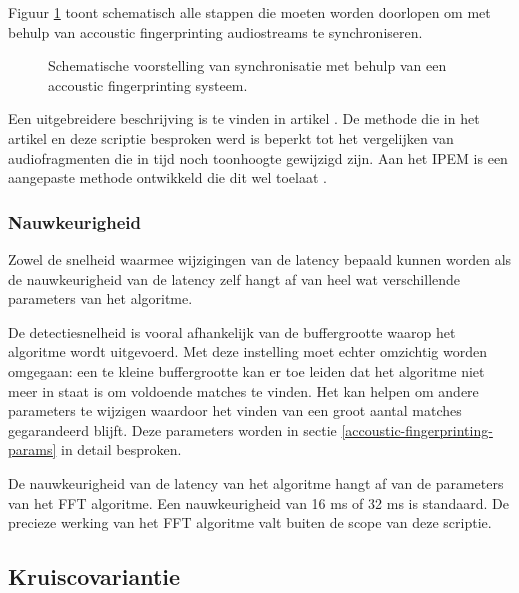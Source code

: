 Figuur \ref{schematische-synchronisatie} toont schematisch alle stappen die moeten worden doorlopen om met behulp van accoustic fingerprinting audiostreams te synchroniseren.

\vspace{0.3cm}
\begin{figure}[h]
	\captionsetup{width=0.7\textwidth}
	\caption[Schema synchronisatie met fingerprinting]{Schematische voorstelling van synchronisatie met behulp van een accoustic fingerprinting systeem.}
	\advance\parskip0.5cm
	
	\advance\parskip1cm
	\label{schematische-synchronisatie}
\end{figure}
\vspace{2.5cm}

Een uitgebreidere beschrijving is te vinden in artikel \cite{Wang2003a}. De methode die in het artikel en deze scriptie besproken werd is beperkt tot het vergelijken van audiofragmenten die in tijd noch toonhoogte gewijzigd zijn. Aan het IPEM is een aangepaste methode ontwikkeld die dit wel toelaat \cite{six2014panako}.

\subsubsection{Nauwkeurigheid}

Zowel de snelheid waarmee wijzigingen van de latency bepaald kunnen worden als de nauwkeurigheid van de latency zelf hangt af van heel wat verschillende parameters van het algoritme.

De detectiesnelheid is vooral afhankelijk van de buffergrootte waarop het algoritme wordt uitgevoerd. Met deze instelling moet echter omzichtig worden omgegaan: een te kleine buffergrootte kan er toe leiden dat het algoritme niet meer in staat is om voldoende matches te vinden. Het kan helpen om andere parameters te wijzigen waardoor het vinden van een groot aantal matches gegarandeerd blijft. Deze parameters worden in sectie \ref{accoustic-fingerprinting-params} in detail besproken.

De nauwkeurigheid van de latency van het algoritme hangt af van de parameters van het FFT algoritme. Een nauwkeurigheid van 16 ms of 32 ms is standaard. De precieze werking van het FFT algoritme valt buiten de scope van deze scriptie.

\subsection{Kruiscovariantie}
\label{kruiscovariantie}

